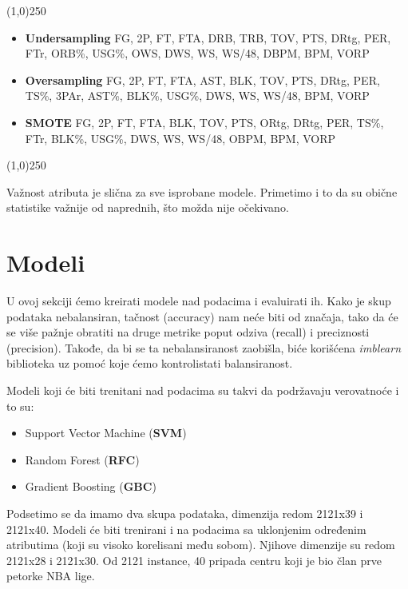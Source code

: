 \documentclass[a4paper]{article}
\begin{document}
\begin{center}
\line(1,0){250}
\end{center}

\begin{itemize}
	\item \textbf{Undersampling} FG, 2P, FT, FTA, DRB, TRB, TOV, PTS, DRtg, PER,
FTr, ORB\%, USG\%, OWS, DWS, WS, WS/48, DBPM, BPM, VORP
	\item \textbf{Oversampling} FG, 2P, FT, FTA, AST, BLK, TOV, PTS, DRtg, PER,
TS\%, 3PAr, AST\%, BLK\%, USG\%, DWS, WS, WS/48, BPM, VORP
	\item \textbf{SMOTE} FG, 2P, FT, FTA, BLK, TOV, PTS, ORtg, DRtg, PER, TS\%,
FTr, BLK\%, USG\%, DWS, WS, WS/48, OBPM, BPM, VORP
\end{itemize}

\begin{center}
\line(1,0){250}
\end{center}

Važnost atributa je slična za sve isprobane modele. Primetimo i to da su obične statistike važnije od naprednih, što možda nije očekivano.

\section{Modeli}
\label{sec:modeli}

U ovoj sekciji ćemo kreirati modele nad podacima i evaluirati ih. Kako je
skup podataka nebalansiran, tačnost (accuracy) nam neće biti od značaja, tako
da će se više pažnje obratiti na druge metrike poput odziva (recall) i preciznosti
(precision). Takođe, da bi se ta nebalansiranost zaobišla, biće korišćena \textit{imblearn} biblioteka uz pomoć koje ćemo kontrolistati balansiranost.

Modeli koji će biti trenitani nad podacima su takvi da podržavaju verovatnoće i to su:
\begin{itemize}
	\item Support Vector Machine (\textbf{SVM})
	\item Random Forest (\textbf{RFC})
	\item Gradient Boosting (\textbf{GBC})
\end{itemize}

Podsetimo se da imamo dva skupa podataka, dimenzija redom 2121x39 i
2121x40. Modeli će biti trenirani i na podacima sa uklonjenim određenim atributima (koji su visoko korelisani među sobom). Njihove dimenzije su redom 2121x28 i 2121x30. Od 2121 instance, 40 pripada centru koji je bio član prve petorke NBA lige.
\end{document}
